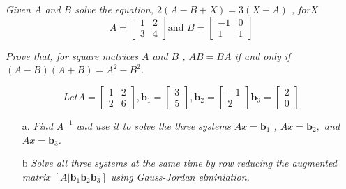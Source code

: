 \documentclass[12pt,letterpaper]{hmcpset}
\begin{document}
\section*{}


\problemlist{}

\begin{problem}[3.2.4]
\textit{Given $A$ and $B$ solve the equation, $2(A-B+X)=3(X-A)$ ,  for$X$}
$$ A= \begin{bmatrix}
1&2\\3&4
\end{bmatrix} \text{and } B=\begin{bmatrix}
-1&0\\1&1
\end{bmatrix}
$$
\end{problem}

\begin{solution}

\end{solution}
\newpage
\begin{problem}[3.2.22]
\textit{Prove that, for square matrices $A$ and $B$ , $AB=BA$ if and only if $(A-B)(A+B) = A^2-B^2$.}
\end{problem}

\begin{solution}

\end{solution}
\newpage
\begin{problem}[3.3.13]
$$\textit{Let} A=\begin{bmatrix}
1&2\\2&6
\end{bmatrix}, \textbf{b}_1=\begin{bmatrix}
3\\5
\end{bmatrix}
,\textbf{b}_2=\begin{bmatrix}
-1\\2
\end{bmatrix}
\textbf{b}_3=\begin{bmatrix}
2\\0
\end{bmatrix}
$$
\begin{enumerate}
\item[a.]\textit{Find $A^{-1}$ and use it to solve the three systems $Ax=\textbf{b}_1$ , $Ax=\textbf{b}_2 ,$ and $Ax=\textbf{b}_3$.}
\item[b]\textit{Solve all three systems at the same time by row reducing the augmented\\ matrix $\left[ A | \textbf{b}_1 \textbf{b}_2 \textbf{b}_3\right]$ using Gauss-Jordan elminiation.}
\end{enumerate}
\end{problem}
\end{document}
